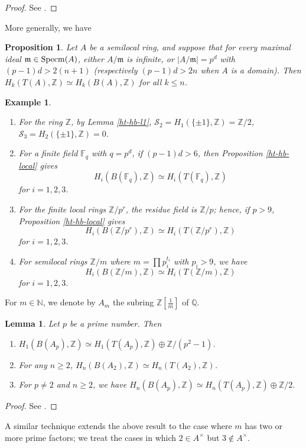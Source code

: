 \documentclass[11pt]{amsart}
\theoremstyle{definition}
\theoremstyle{plain}
\newtheorem{lem}[ntn]{Lemma}
\newtheorem{prp}[ntn]{Proposition}
\newtheorem{exm}[ntn]{Example}
\numberwithin{equation}{section}
\newcommand{\N}{\mathbb{N}}
\newcommand{\z}{\mathbb{Z}}
\newcommand{\q}{\mathbb{Q}}
\newcommand{\F}{\mathbb{F}}
\renewcommand{\SS}{\mathcal{S}}
\newcommand{\mmm}{\mathfrak{m}}
\renewcommand{\aa}{{A^\times}}
\newcommand{\spcm}{{\rm Specm}}
\begin{document}
\begin{proof}
    See \cite[Proposition 3.19]{hutchinson2017}.
\end{proof}
More generally, we have
\begin{prp}
    \label{ht-hb-semilocal}
    Let $A$ be a semilocal ring, and suppose that for every maximal ideal $\mmm\in\spcm(A)$, either $A/\mmm$ is infinite, or $|A/\mmm|=p^d$ with $(p-1)d>2(n+1)$ (respectively $(p-1)d>2n$ when $A$ is a domain). Then $H_k(T(A),\z)\simeq H_k(B(A),\z)$ for all $k\leq n$. 
\end{prp}
\begin{exm}\label{exa-hb-ht}
    \begin{enumerate}
        \item For the ring $\z$, by Lemma \ref{ht-hb-l1}, $\SS_2=H_1(\{\pm 1\},\z)=\z/2$, $\SS_3=H_2(\{\pm 1\},\z)=0$.
        \item For a finite field $\F_q$ with $q=p^d$, if $(p-1)d>6$, then Proposition \ref{ht-hb-local} gives
        \[
            H_i(B(\F_q),\z)\simeq H_i(T(\F_q),\z)
        \]
        for $i=1,2,3$.
        \item For the finite local rings $\z/p^r$, the residue field is $\z/p$; hence, if $p>9$, Proposition \ref{ht-hb-local} gives
        \[
            H_i(B(\z/p^r),\z)\simeq H_i(T(\z/p^r),\z)
        \]
        for $i=1,2,3$.
        \item For semilocal rings $\z/m$ where $m=\prod p_i^{t_i}$ with $p_i>9$, we have
        \[
            H_i(B(\z/m),\z)\simeq H_i(T(\z/m),\z)
        \]
        for $i=1,2,3$.
    \end{enumerate}
\end{exm}
For $m\in\N$, we denote by $A_m$ the subring $\z\left[\frac{1}{m}\right]$ of $\q$.
\begin{lem}
    Let $p$ be a prime number. Then
    \begin{enumerate}
        \item $H_1(B(A_p),\z)\simeq H_1(T(A_p),\z)\oplus\z/(p^2-1)$.
        \item For any $n\geq 2$, $H_n(B(A_2),\z)\simeq H_n(T(A_2),\z)$.
        \item For $p\neq 2$ and $n\geq 2$, we have $H_n(B(A_p),\z)\simeq H_n(T(A_p),\z)\oplus\z/2$.
    \end{enumerate}
\end{lem}
\begin{proof}
    See \cite[Lemma 3.7]{B-E--2023}.
\end{proof}
A similar technique extends the above result to the case where $m$ has two or more prime factors; we treat the cases in which $2\in\aa$ but $3\notin\aa$.
\end{document}
